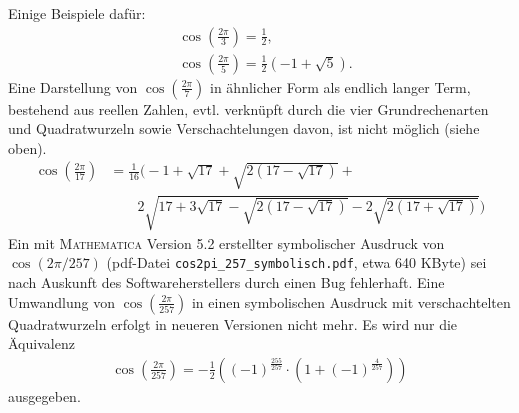 \documentclass[11pt]{article}
\begin{document}
Einige Beispiele dafür:
\begin{align*}  
  &\cos \left(\frac{2\pi}{3}\right)=\frac{1}{2},\\
  &\cos \left(\frac{2\pi}{5}\right)=\frac{1}{2}\left(-1+\sqrt{5}\right).
\end{align*}
Eine Darstellung von $\cos \left(\frac{2\pi}{7}\right)$ in ähnlicher Form als
endlich langer Term, bestehend aus reellen Zahlen, evtl. verknüpft durch die
vier Grundrechenarten und Quadratwurzeln sowie Verschachtelungen davon, ist
nicht möglich (siehe oben). 
\begin{align*}
  \cos \left(\frac{2\pi}{17}\right)&= \frac{1}{16}
  \Bigg(-1+\sqrt{17}+\sqrt{{2\left(17-\sqrt{17}\right)}}+\\
  &\qquad 2\sqrt{17+3\sqrt{17}-\sqrt{2\left(17-\sqrt{17}\right)}
    -2\sqrt{2\left(17+\sqrt{17}\right)}}\Bigg) 
\end{align*}
Ein mit \textsc{Mathematica} Version 5.2 erstellter symbolischer Ausdruck von
$\cos(2\pi/257)$ (pdf-Datei \texttt{cos2pi\_257\_symbolisch.pdf}, etwa 640
KByte) sei nach Auskunft des Softwareherstellers durch einen Bug fehlerhaft.
Eine Umwandlung von $\cos\left(\frac{2\pi}{257}\right)$ in einen symbolischen
Ausdruck mit verschachtelten Quadratwurzeln erfolgt in neueren Versionen nicht
mehr. Es wird nur die Äquivalenz
\begin{gather*}
  \cos\left(\frac{2\pi}{257}\right)=
  -\frac{1}{2}\left(\left(-1\right)^{\frac{255}{257}}\cdot
  \left(1+\left(-1\right)^{\frac{4}{257}}\right)\right)
\end{gather*}
ausgegeben.
\end{document}
